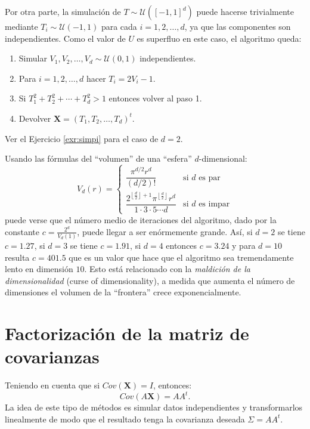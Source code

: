 \documentclass[
]{book}
\theoremstyle{break}
\theoremstyle{definition}
\theoremstyle{definition}
\theoremstyle{definition}
\theoremstyle{remark}
\begin{document}
Por otra parte, la simulación de \(T \sim \mathcal{U}\left( \left[ -1,1\right] ^{d}\right)\) puede hacerse trivialmente mediante
\(T_i \sim \mathcal{U}\left( -1, 1 \right)\)
para cada \(i=1,2,\ldots,d\), ya que las
componentes son independientes. Como el valor de \(U\) es superfluo en
este caso, el algoritmo queda:

\begin{enumerate}
\def\labelenumi{\arabic{enumi}.}
\item
  Simular \(V_1,V_2,\ldots,V_d \sim \mathcal{U}\left( 0,1\right)\) independientes.
\item
  Para \(i = 1, 2, \ldots, d\) hacer \(T_i = 2V_i - 1\).
\item
  Si \(T_1^2 + T_2^2 + \cdots + T_d^2 > 1\) entonces volver al paso 1.
\item
  Devolver \(\mathbf{X} = \left( T_1, T_2, \ldots, T_d \right)^t\).
\end{enumerate}

Ver el Ejercicio \ref{exr:simpi} para el caso de \(d=2\).

Usando las fórmulas del ``volumen'' de una ``esfera'' \(d\)-dimensional:
\[V_d\left( r\right)  =\left\{
\begin{array}{ll}
\dfrac{\pi^{d/2}r^{d}}{\left( d/2\right)  !} & \text{si } d \text{ es par}\\
\dfrac{2^{\left\lfloor \frac{d}{2}\right\rfloor +1}\pi^{\left\lfloor \frac{d}{2}\right\rfloor }r^{d}}{1\cdot3\cdot5\cdots d} & \text{si } d \text{ es impar}
\end{array}\right.\]
puede verse que el número medio de iteraciones del algoritmo, dado por la constante
\(c=\frac{2^{d}}{V_d\left(1 \right)}\), puede llegar a ser enórmemente grande.
Así, si \(d=2\) se tiene \(c=1.27\), si \(d=3\) se tiene \(c=1.91\), si \(d=4\) entonces \(c=3.24\) y para
\(d=10\) resulta \(c=401.5\) que es un valor que hace que el algoritmo sea
tremendamente lento en dimensión \(10\).
Esto está relacionado con la \emph{maldición de la dimensionalidad} (curse of dimensionality), a medida que aumenta el número de dimensiones el volumen de la ``frontera'' crece exponencialmente.

\hypertarget{fact-cov}{%
\section{Factorización de la matriz de covarianzas}\label{fact-cov}}

Teniendo en cuenta que si \(Cov(\mathbf{X})= I\), entonces:
\[Cov(A\mathbf{X}) = AA^t.\]
La idea de este tipo de métodos es simular datos independientes y transformarlos linealmente de modo que el resultado tenga la covarianza deseada \(\Sigma = AA^t\).
\end{document}

